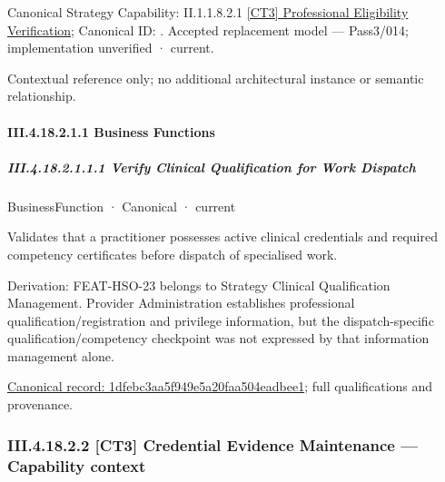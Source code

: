 {\small Canonical Strategy Capability: II.1.1.8.2.1 \hyperref[element:3b43d350a52a4b608bc01eb2530a91be]{[CT3] Professional Eligibility Verification}; Canonical ID: \texttt{}. Accepted replacement model — Pass3/014; implementation unverified · current.}\par
Contextual reference only; no additional architectural instance or semantic relationship.\par
\paragraph*{III.4.18.2.1.1 Business Functions}
\label{navigation:III.4.18.2.1.1}

\subparagraph*{III.4.18.2.1.1.1 Verify Clinical Qualification for Work Dispatch}
\label{navigation:III.4.18.2.1.1.1}

\label{element:1dfebc3aa5f949e5a20faa504eadbee1}
{\small BusinessFunction · Canonical · current}\par

Validates that a practitioner possesses active clinical credentials and required competency certificates before dispatch of specialised work.



Derivation: FEAT-HSO-23 belongs to Strategy Clinical Qualification Management. Provider Administration establishes professional qualification/registration and privilege information, but the dispatch-specific qualification/competency checkpoint was not expressed by that information management alone.


{\footnotesize \href{../../../../../../../continuum/business/business-function/1dfebc3aa5f949e5a20faa504eadbee1.md}{Canonical record: 1dfebc3aa5f949e5a20faa504eadbee1}; full qualifications and provenance.}\par
\subsubsection*{III.4.18.2.2 [CT3] Credential Evidence Maintenance — Capability context}
\label{navigation:III.4.18.2.2}

